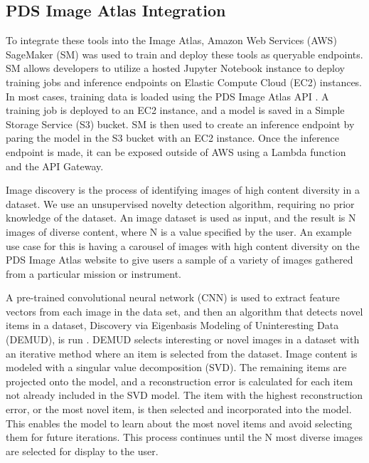 \subsection{PDS Image Atlas Integration}
To integrate these tools into the Image Atlas, Amazon Web Services (AWS) SageMaker (SM) was used to train and deploy these tools as queryable endpoints. 
SM allows developers to utilize a hosted Jupyter Notebook instance to deploy training jobs and inference endpoints on Elastic Compute Cloud (EC2) instances. 
In most cases, training data is loaded using the PDS Image Atlas API \parencite{grimes2018pds}. 
A training job is deployed to an EC2 instance, and a model is saved in a Simple Storage Service (S3) bucket. 
SM is then used to create an inference endpoint by paring the model in the S3 bucket with an EC2 instance. 
Once the inference endpoint is made, it can be exposed outside of AWS using a Lambda function and the API Gateway.

Image discovery is the process of identifying images of high content diversity in a dataset.
We use an unsupervised novelty detection algorithm, requiring no prior knowledge of the dataset. 
An image dataset is used as input, and the result is N images of diverse content, where N is a value specified by the user. 
An example use case for this is having a carousel of images with high content diversity on the PDS Image Atlas website to give users a sample of a variety of images gathered from a particular mission or instrument.

A pre-trained convolutional neural network (CNN) is used to extract feature vectors from each image in the data set, and then an algorithm that detects novel items in a dataset, Discovery via Eigenbasis Modeling of Uninteresting Data (DEMUD), is run \parencite{wagstaff_demud}.
DEMUD selects interesting or novel images in a dataset with an iterative method where an item is selected from the dataset. 
Image content is modeled with a singular value decomposition (SVD). 
The remaining items are projected onto the model, and a reconstruction error is calculated for each item not already included in the SVD model. 
The item with the highest reconstruction error, or the most novel item, is then selected and incorporated into the model. 
This enables the model to learn about the most novel items and avoid selecting them for future iterations. 
This process continues until the N most diverse images are selected for display to the user.
